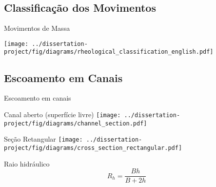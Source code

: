 \subsection{Classificação dos Movimentos}

\begin{frame}{Movimentos de Massa}
    \begin{minipage}[c]{0.70\textwidth}
        \centering
        \texttt{[image: ../dissertation-project/fig/diagrams/rheological\_classification\_english.pdf]}
    \end{minipage}
    \hfill    
    \begin{minipage}[c]{0.28\textwidth}
    \end{minipage}
\end{frame}


\subsection{Escoamento em Canais}

\begin{frame}{Escoamento em canais}
    \begin{minipage}[c]{0.56\textwidth}
        \begin{exampleblock}{Canal aberto (superfície livre)}
            \centering
            \texttt{[image: ../dissertation-project/fig/diagrams/channel\_section.pdf]}
        \end{exampleblock}
    \end{minipage}
    \hfill
    \pause
    \begin{minipage}[c]{0.36\textwidth}
        \begin{exampleblock}{Seção Retangular}
            \centering
            \texttt{[image: ../dissertation-project/fig/diagrams/cross\_section\_rectangular.pdf]}
        \end{exampleblock}
        \begin{exampleblock}{Raio hidráulico}
            \begin{equation}
                R_h = \frac{Bh}{B+2h}
            \end{equation}
        \end{exampleblock}
    \end{minipage}
\end{frame}

